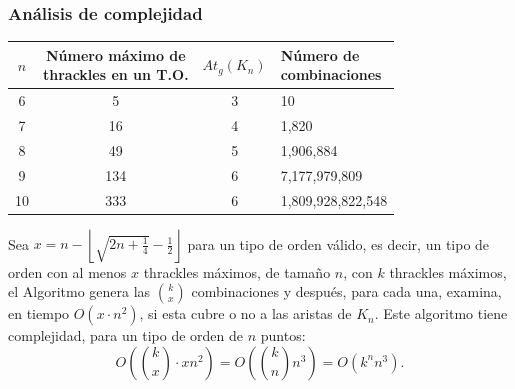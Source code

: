 \begin{frame} \frametitle{Análisis de complejidad}
\begin{table}
	\centering
	\begin{tabular}{|c|c|c|l|}
		\hline
		$n$ & \makecell{Número máximo de \\ thrackles en un T.O.} &$At_g(K_n)$& \makecell{Número de \\      combinaciones} \\
		\hline
		6 & 5 & 3 & 10 \\ \hline
		7 & 16 & 4 & 1,820 \\\hline
		8 & 49 & 5 & 1,906,884 \\\hline
		9 & 134 & 6 & 7,177,979,809 \\\hline
		10 & 333 & 6 & 1,809,928,822,548 \\ \hline
	\end{tabular}
\end{table}
Sea $x=n - \left\lfloor\sqrt{2n + \frac{1}{4}} - \frac{1}{2}\right\rfloor$ para un tipo de orden válido, es decir, un tipo de orden con al menos $x$ thrackles máximos, de tamaño $n$, con $k$ thrackles máximos, el Algoritmo genera las
$\binom{k}{x}$ combinaciones y después, para cada una, examina, en tiempo $O(x \cdot n^2)$, si esta cubre o no a las aristas de $K_n$. Este algoritmo tiene complejidad, para un tipo de orden de $n$ puntos:
\begin{equation*}\displaystyle
O\left(\binom{k}{x}\cdot x n^2 \right) = O \left( \binom{k}{n} n^3 \right) = O(k^n n^3).
\label{complejidad_colecciones}
\end{equation*}
\end{frame}